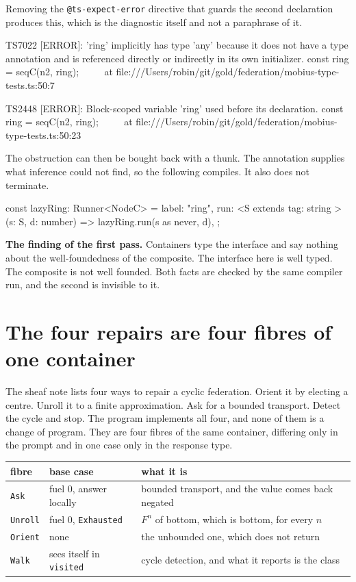 \documentclass[11pt,a4paper]{article}
\begin{document}
Removing the \verb|@ts-expect-error| directive that guards the second declaration
produces this, which is the diagnostic itself and not a paraphrase of it.

\begin{term}
TS7022 [ERROR]: 'ring' implicitly has type 'any' because it does not have a type
annotation and is referenced directly or indirectly in its own initializer.
const ring = seqC(n2, ring);
      ~~~~
    at file:///Users/robin/git/gold/federation/mobius-type-tests.ts:50:7

TS2448 [ERROR]: Block-scoped variable 'ring' used before its declaration.
const ring = seqC(n2, ring);
                      ~~~~
    at file:///Users/robin/git/gold/federation/mobius-type-tests.ts:50:23
\end{term}

The obstruction can then be bought back with a thunk. The annotation supplies what
inference could not find, so the following compiles. It also does not terminate.

\begin{code}
const lazyRing: Runner<NodeC> = {
  label: "ring",
  run: <S extends { tag: string }>(s: S, d: number) => lazyRing.run(s as never, d),
};
\end{code}

\begin{alarmbox}
\textbf{The finding of the first pass.} Containers type the interface and say nothing
about the well-foundedness of the composite. The interface here is well typed. The
composite is not well founded. Both facts are checked by the same compiler run, and
the second is invisible to it.
\end{alarmbox}

\section{The four repairs are four fibres of one container}

The sheaf note lists four ways to repair a cyclic federation. Orient it by electing a
centre. Unroll it to a finite approximation. Ask for a bounded transport. Detect the
cycle and stop. The program implements all four, and none of them is a change of
program. They are four fibres of the same container, differing only in the prompt and
in one case only in the response type.

\begin{center}
\begin{tabular}{@{}llp{7.4cm}@{}}
\toprule
\textbf{fibre} & \textbf{base case} & \textbf{what it is} \\
\midrule
\verb|Ask|    & fuel 0, answer locally & bounded transport, and the value comes back negated \\
\verb|Unroll| & fuel 0, \verb|Exhausted| & $F^n$ of bottom, which is bottom, for every $n$ \\
\verb|Orient| & none & the unbounded one, which does not return \\
\verb|Walk|   & sees itself in \verb|visited| & cycle detection, and what it reports is the class \\
\bottomrule
\end{tabular}
\end{center}
\end{document}
